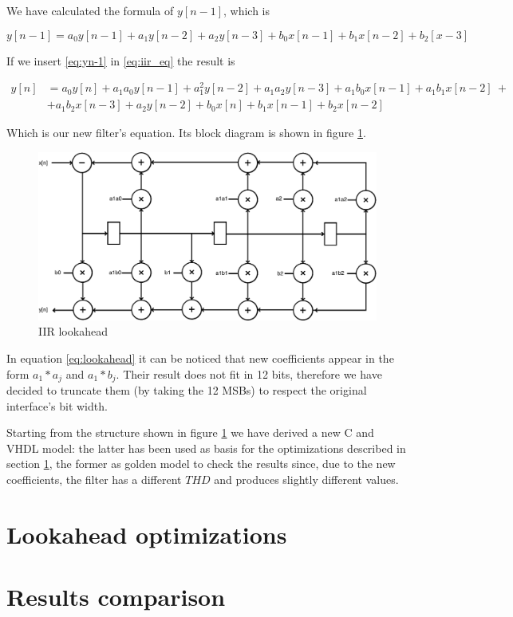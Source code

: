 We have calculated the formula of $y[n-1]$, which is

\begin{equation}
    \label{eq:yn-1}
    y[n-1] = a_{0}y[n-1] + a_{1}y[n-2] + a_{2}y[n-3] + b_{0}x[n-1] + b_{1}x[n-2] + b_2[x-3]
\end{equation}

If we insert \ref{eq:yn-1} in \ref{eq:iir_eq} the result is

\begin{equation}
    \label{eq:lookahead}
    \begin{split}
        y[n] &= a_{0}y[n] + a_{1}a_{0}y[n-1] + a^2_{1}y[n-2] + a_{1}a_{2}y[n-3] + a_{1}b_{0}x[n-1] + a_{1}b_{1}x[n-2]\ + \\
    & + a_{1}b_{2}x[n-3] + a_{2}y[n-2] + b_{0}x[n] + b_{1}x[n-1] + b_{2}x[n-2]
    \end{split}
\end{equation}

Which is our new filter's equation. Its block diagram is shown in figure \ref{fig:iir_lookahead}.

\begin{figure}[!ht]
	\centering
	\includegraphics[width=0.7\linewidth]{./chapters/pictures/irr_lookahead.pdf}
	\caption{IIR lookahead}
	\label{fig:iir_lookahead}
\end{figure}

In equation \ref{eq:lookahead} it can be noticed that new coefficients appear in the form $a_{1}*a_{j}$ and $a_{1}*b_{j}$.
Their result does not fit in 12 bits, therefore we have decided to truncate them (by taking the 12 MSBs) to respect the original interface's bit width.

Starting from the structure shown in figure \ref{fig:iir_lookahead} we have derived a new C and VHDL model: the latter has been used as basis for the
optimizations described in section \ref{sec:iir_opt}, the former as golden model to check the results since, due to the new coefficients, the filter
has a different $THD$ and produces slightly different values. 

\section{Lookahead optimizations}
\label{sec:iir_opt}



\section{Results comparison}